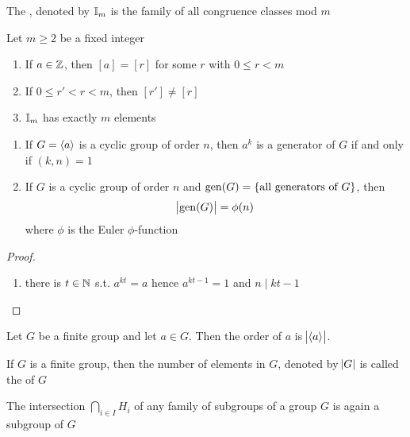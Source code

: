 \documentclass[11pt]{article}
\begin{document}
\begin{definition}[]
The , denoted by \(\mathbb{I}_m\) is the family of all congruence
classes mod \(m\)
\end{definition}


\begin{proposition}[]
Let \(m\ge 2\) be a fixed integer
\begin{enumerate}
\item If \(a\in \mathbb{Z}\), then \([a]=[r]\) for some \(r\) with \(0\le r<m\)
\item If \(0\le r'<r<m\), then \([r']\neq[r]\)
\item \(\mathbb{I}_m\) has exactly \(m\) elements
\end{enumerate}
\end{proposition}

\begin{theorem}[]
\begin{enumerate}
\item If \(G=\langle a\rangle\) is a cyclic group of order \(n\), then \(a^k\) is a generator
of \(G\) if and only if \((k,n)=1\)
\item If \(G\) is a cyclic group of order \(n\) and \(\operatorname{gen}(G)=\{\text{all generators
      of } G\}\), then
\begin{equation*}
\abs{\operatorname{gen}(G)}=\phi(n)
\end{equation*}
where \(\phi\) is the Euler \(\phi\)-function
\end{enumerate}
\end{theorem}
\begin{proof}
\begin{enumerate}
\item there is \(t\in\mathbb{N}\) s.t. \(a^{kt}=a\) hence \(a^{kt-1}=1\) and \(n\mid kt-1\)
\end{enumerate}
\end{proof}

\begin{proposition}[]
Let \(G\) be a finite group and let \(a\in G\). Then the order of \(a\) is
\(\abs{\langle a\rangle}\).
\end{proposition}

\begin{definition}[]
If \(G\) is a finite group, then the number of elements in \(G\), denoted by
\(\abs{G}\) is called the  of \(G\)
\end{definition}


\begin{proposition}[]
The intersection \(\bigcap_{i\in I}H_i\) of any family of subgroups of a group
\(G\) is again a subgroup of \(G\)
\end{proposition}
\end{document}
